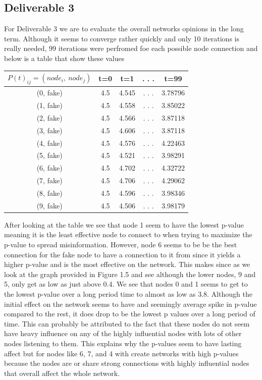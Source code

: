 \documentclass[letterpaper]{article}
\begin{document}
\subsection{ Deliverable 3}
For Deliverable 3 we are to evaluate the overall networks opinions in the long term. Although it seems to converge rather quickly and only 10 iterations is really needed, 99 iterations were perfromed foe each possible node connection and below is a table that show these values 
\begin{center}
	\begin{tabular}{| c | c | c | c | c |}
		\hline  
		 $P(t)_{ij}= (node_i, \ node_j)$    & t=0 & t=1 & . . . & t=99\\
		\hline
		 (0, fake) & 4.5 & 4.545  &  . . .  &  3.78796\\  
		\hline
		 (1, fake) & 4.5 & 4.558 & . . .  & 3.85022 \\ 
		\hline
		(2, fake) & 4.5 & 4.566  & . . .  & 3.87118 \\  
		\hline
		(3, fake) & 4.5 & 4.606  & . . .  & 3.87118 \\  
		\hline
		(4, fake) & 4.5 & 4.576  & . . .  & 4.22463 \\  
		\hline
		(5, fake) & 4.5 & 4.521  & . . .  & 3.98291 \\   
		\hline
		(6, fake) & 4.5 & 4.702  & . . .  & 4.32722  \\  
		\hline
		(7, fake) & 4.5 & 4.706  & . . .  & 4.29062  \\  
		\hline
		(8, fake) & 4.5 & 4.596  & . . .  & 3.98346  \\  
		\hline
		(9, fake) & 4.5 & 4.506  & . . .  &  3.98179 \\  
		\hline
	\end{tabular}
\end{center}
After looking at the table we see that node 1 seem to have the lowest p-value meaning it is the least effective node to connect to when trying to maximize the p-value to spread misinformation.  However, node 6 seems to be be the best connection for the fake node to have a connection to it from since it yields a higher p-value and is the most effective on the network. This makes since as we look at the graph provided in Figure 1.5 and see although the lower nodes, 9 and 5, only get as low as just above 0.4.  We see that nodes 0 and 1 seems to get to the lowest p-value over a long period time to almost as low as 3.8.  Although the initial effect on the network seems to have and seemingly average spike in p-value compared to the rest, it does drop to be the lowest p values over  a long period of time.  This can probably be attributed to the fact that these nodes do not seem have heavy influence on any of the highly influential nodes with lots of other nodes listening to them.  This explains why the p-values seem to have lasting affect but for nodes like 6, 7, and 4 with create networks with high p-values because  the nodes are or share strong connections with highly influential nodes that overall affect the whole network.   
\end{document}
